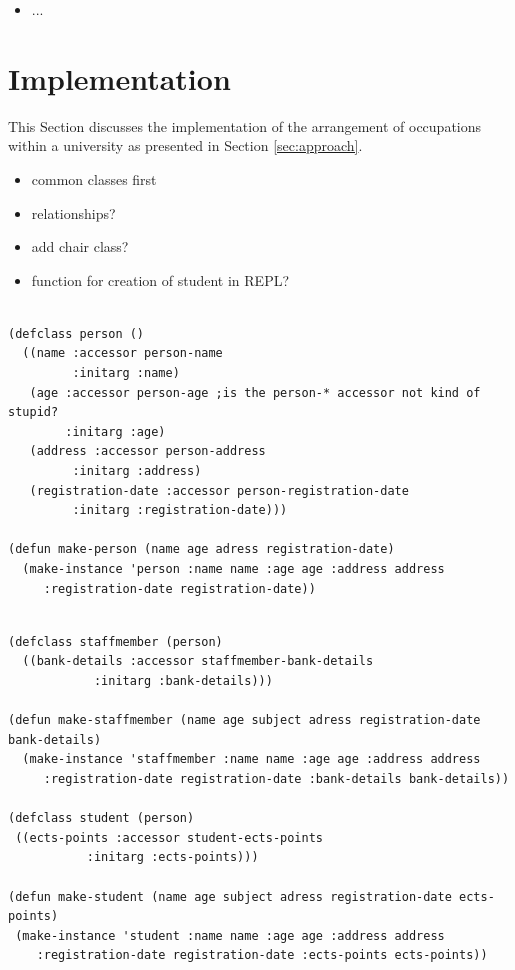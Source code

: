 \documentclass[oribibl]{llncs}
\begin{document}
\begin{itemize}
\item ...
\end{itemize}


\section{Implementation}
\label{sec:implementation}

This Section discusses the implementation of the arrangement of occupations within a university as presented in Section \ref{sec:approach}. 

\begin{itemize}
\item common classes first
\item relationships?
\item add chair class?
\item function for creation of student in REPL?

\end{itemize}

\begin{listing}[]%
\begin{verbatim}

(defclass person ()
  ((name :accessor person-name
         :initarg :name)
   (age :accessor person-age ;is the person-* accessor not kind of stupid?
        :initarg :age)
   (address :accessor person-address
         :initarg :address)
   (registration-date :accessor person-registration-date
         :initarg :registration-date)))

(defun make-person (name age adress registration-date)
  (make-instance 'person :name name :age age :address address
     :registration-date registration-date))
     
\end{verbatim}
\caption{The basic \texttt{person} class WIP}
\label{lst:clossyntax}
\end{listing}

\begin{listing}[]%
\begin{verbatim}
(defclass staffmember (person)
  ((bank-details :accessor staffmember-bank-details
            :initarg :bank-details)))

(defun make-staffmember (name age subject adress registration-date bank-details)
  (make-instance 'staffmember :name name :age age :address address
     :registration-date registration-date :bank-details bank-details))

(defclass student (person)
 ((ects-points :accessor student-ects-points
           :initarg :ects-points)))

(defun make-student (name age subject adress registration-date ects-points)
 (make-instance 'student :name name :age age :address address
    :registration-date registration-date :ects-points ects-points))

\end{verbatim}
\caption{The interface to access the data in a human readable manner WIP}
\label{lst:clossyntax}
\end{listing}
\end{document}
